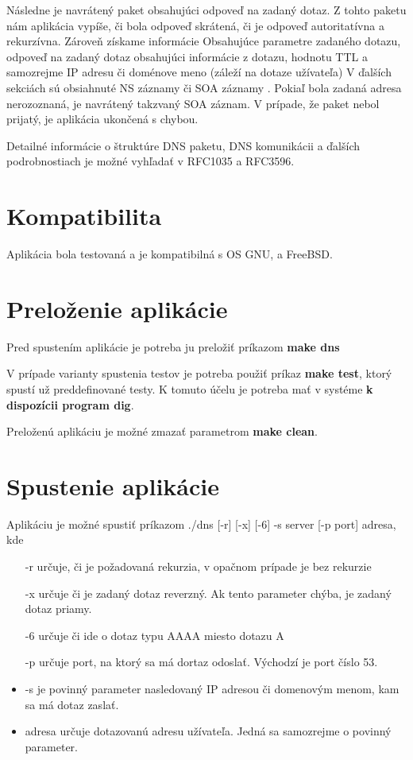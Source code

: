 \documentclass[a4paper,11pt]{article}
\begin{document}
Následne je navrátený paket obsahujúci odpoveď na zadaný dotaz. Z tohto paketu nám aplikácia vypíše, či bola odpoveď skrátená, či je odpoveď autoritatívna a rekurzívna. Zároveň získame informácie Obsahujúce parametre zadaného dotazu, odpoveď na zadaný dotaz obsahujúci informácie z dotazu, hodnotu TTL a samozrejme IP adresu či doménove meno (záleží na dotaze užívateľa) V ďalších sekciách sú obsiahnuté NS záznamy či SOA záznamy . Pokiaľ bola zadaná adresa nerozoznaná, je navrátený takzvaný SOA záznam. V prípade, že paket nebol prijatý, je aplikácia ukončená s chybou. 

Detailné informácie o štruktúre DNS paketu, DNS komunikácii a ďalších podrobnostiach je možné vyhľadať v RFC1035 a RFC3596.

\section{Kompatibilita}
Aplikácia bola testovaná a je kompatibilná s OS GNU, a FreeBSD.

\section{Preloženie aplikácie}
Pred spustením aplikácie je potreba ju preložiť príkazom \textbf{make dns}

V prípade varianty spustenia testov je potreba použiť príkaz \textbf{make test}, ktorý spustí už preddefinované testy. K tomuto účelu je potreba mať v systéme \textbf{k dispozícii program dig}.

Preloženú aplikáciu je možné zmazať parametrom \textbf{make clean}.


\section{Spustenie aplikácie}
Aplikáciu je možné spustiť príkazom
./dns [-r] [-x] [-6] -s server [-p port] adresa, kde
\begin{itemize}
    \item [-r] určuje, či je požadovaná rekurzia, v opačnom prípade je bez rekurzie
    \item [-x] určuje či je zadaný dotaz reverzný. Ak tento parameter chýba, je zadaný dotaz priamy.
    \item [-6] určuje či ide o dotaz typu AAAA miesto dotazu A
    \item [-p] určuje port, na ktorý sa má dortaz odoslať. Východzí je port číslo 53.
    \item -s je povinný parameter nasledovaný IP adresou či domenovým  menom, kam sa má dotaz zaslať.
    \item adresa určuje dotazovanú adresu užívateľa. Jedná sa samozrejme o povinný parameter.
\end{itemize}
\end{document}
